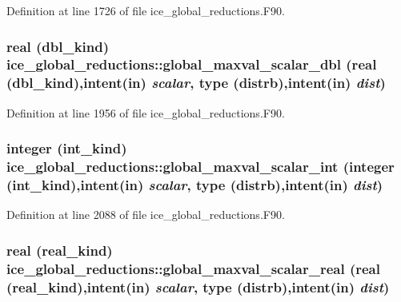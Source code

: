 Definition at line 1726 of file ice\_\-global\_\-reductions.F90.\hypertarget{namespaceice__global__reductions_a08a9bbce6bc2a8c8961009e0923ac274}{
\subsubsection[{global\_\-maxval\_\-scalar\_\-dbl}]{\setlength{\rightskip}{0pt plus 5cm}real (dbl\_\-kind) ice\_\-global\_\-reductions::global\_\-maxval\_\-scalar\_\-dbl (real (dbl\_\-kind),intent(in) {\em scalar}, \/  type (distrb),intent(in) {\em dist})}}
\label{namespaceice__global__reductions_a08a9bbce6bc2a8c8961009e0923ac274}


Definition at line 1956 of file ice\_\-global\_\-reductions.F90.\hypertarget{namespaceice__global__reductions_aa1013da08de374f45ff86d6d2be77581}{
\subsubsection[{global\_\-maxval\_\-scalar\_\-int}]{\setlength{\rightskip}{0pt plus 5cm}integer (int\_\-kind) ice\_\-global\_\-reductions::global\_\-maxval\_\-scalar\_\-int (integer (int\_\-kind),intent(in) {\em scalar}, \/  type (distrb),intent(in) {\em dist})}}
\label{namespaceice__global__reductions_aa1013da08de374f45ff86d6d2be77581}


Definition at line 2088 of file ice\_\-global\_\-reductions.F90.\hypertarget{namespaceice__global__reductions_a1f4cce7e3e8f22f0366ff60313a3e697}{
\subsubsection[{global\_\-maxval\_\-scalar\_\-real}]{\setlength{\rightskip}{0pt plus 5cm}real (real\_\-kind) ice\_\-global\_\-reductions::global\_\-maxval\_\-scalar\_\-real (real (real\_\-kind),intent(in) {\em scalar}, \/  type (distrb),intent(in) {\em dist})}}
\label{namespaceice__global__reductions_a1f4cce7e3e8f22f0366ff60313a3e697}


